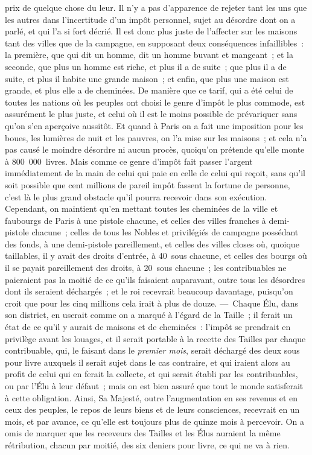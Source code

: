 \documentclass[french,twoside]{book} %
\begin{document}
prix de quelque chose du leur. Il n’y a pas d’apparence de rejeter tant les uns que les autres dans l’incertitude d’un impôt personnel, sujet au désordre dont on a parlé, et qui l’a si fort décrié. Il est donc plus juste de l’affecter sur les maisons tant des villes que de la campagne, en supposant deux conséquences infaillibles : la première, que qui dit un homme, dit un homme buvant et mangeant ; et la seconde, que plus un homme est riche, et plus il a de suite ; que plus il a de suite, et plus il habite une grande maison ; et enfin, que plus une maison est grande, et plus elle a de cheminées. De manière que ce tarif, qui a été celui de toutes les nations où les peuples ont choisi le genre d’impôt le plus commode, est assurément le plus juste, et celui où il est le moins possible de prévariquer sans qu’on s’en aperçoive aussitôt. Et quand à Paris on a fait une imposition pour les boues, les lumières de nuit et les pauvres, on l’a mise sur les maisons ; et cela n’a pas causé le moindre désordre ni aucun procès, quoiqu’on prétende qu’elle monte à 800 000 livres. Mais comme ce genre d’impôt fait passer l’argent immédiatement de la main de celui qui paie en celle de celui qui reçoit, sans qu’il soit possible que cent millions de pareil impôt fassent la fortune de personne, c’est là le plus grand obstacle qu’il pourra recevoir dans son exécution. Cependant, on maintient qu’en mettant toutes les cheminées de la ville et faubourgs de Paris à une pistole chacune, et celles des villes franches à demi-pistole chacune ; celles de tous les Nobles et privilégiés de campagne possédant des fonds, à une demi-pistole pareillement, et celles des villes closes où, quoique taillables, il y avait des droits d’entrée, à 40 sous chacune, et celles des bourgs où il se payait pareillement des droits, à 20 sous chacune ; les contribuables ne paieraient pas la moitié de ce qu’ils faisaient auparavant, outre tous les désordres dont ils seraient déchargés ; et le roi recevrait beaucoup davantage, puisqu’on croit que pour les cinq millions cela irait à plus de douze. — Chaque Élu, dans son district, en userait comme on a marqué à l’égard de la Taille ; il ferait un état de ce qu’il y aurait de maisons et de cheminées : l’impôt se prendrait en privilège avant les louages, et il serait portable à la recette des Tailles par chaque contribuable, qui, le faisant dans le {\itshape premier mois}, serait déchargé des deux sous pour livre auxquels il serait sujet dans le cas contraire, et qui iraient alors au profit de celui qui en ferait la collecte, et qui serait établi par les contribuables, ou par l’Élu à leur défaut ; mais on est bien assuré que tout le monde satisferait à cette obligation. Ainsi, Sa Majesté, outre l’augmentation en ses revenus et en ceux des peuples, le repos de leurs biens et de leurs consciences, recevrait en un mois, et par avance, ce qu’elle est toujours plus de quinze mois à percevoir. On a omis de marquer que les receveurs des Tailles et les Élus auraient la même rétribution, chacun par moitié, des six deniers pour livre, ce qui ne va à rien.
\end{document}
